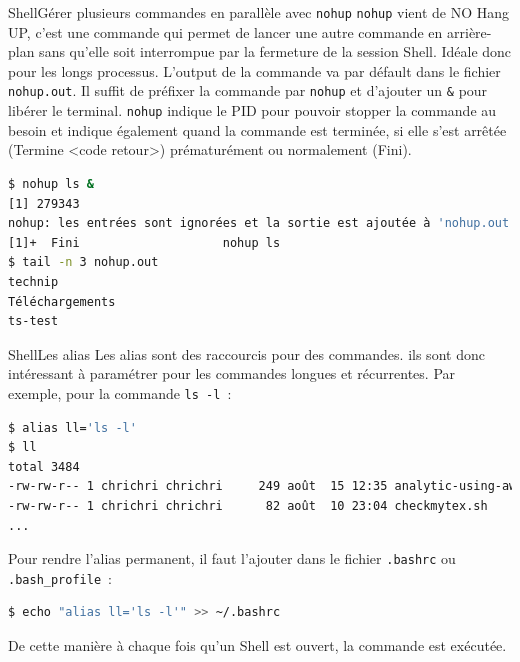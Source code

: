 \documentclass{beamer}
\begin{document}
    \begin{frame}[fragile]{Shell}{Gérer plusieurs commandes en parallèle avec \lstinline{nohup}}
        \lstinline{nohup} vient de NO Hang UP, c'est une commande qui permet de lancer une autre commande en arrière-plan sans qu'elle soit interrompue par la fermeture de la session Shell.
        Idéale donc pour les longs processus.
        L'output de la commande va par défault dans le fichier \lstinline{nohup.out}.
        \bigbreak
        Il suffit de préfixer la commande par \lstinline{nohup} et d'ajouter un \lstinline{&} pour libérer le terminal.
        \lstinline{nohup} indique le PID pour pouvoir stopper la commande au besoin et indique également quand la commande est terminée, si elle s'est arrêtée (Termine <code retour>) prématurément ou normalement (Fini).
        \begin{lstlisting}[language=bash]
$ nohup ls &
[1] 279343
nohup: les entrées sont ignorées et la sortie est ajoutée à 'nohup.out'
[1]+  Fini                    nohup ls
$ tail -n 3 nohup.out
technip
Téléchargements
ts-test
        \end{lstlisting}
    \end{frame}

    \begin{frame}[fragile]{Shell}{Les alias}
        Les alias sont des raccourcis pour des commandes.
        ils sont donc intéressant à paramétrer pour les commandes longues et récurrentes.
        \bigbreak
        Par exemple, pour la commande \lstinline{ls -l}~:
        \begin{lstlisting}[language=bash]
$ alias ll='ls -l'
$ ll
total 3484
-rw-rw-r-- 1 chrichri chrichri     249 août  15 12:35 analytic-using-awk.sh
-rw-rw-r-- 1 chrichri chrichri      82 août  10 23:04 checkmytex.sh
...
        \end{lstlisting}
        \bigbreak
        Pour rendre l'alias permanent, il faut l'ajouter dans le fichier \lstinline{.bashrc} ou \lstinline{.bash_profile}~:
        \begin{lstlisting}[language=bash]
$ echo "alias ll='ls -l'" >> ~/.bashrc
        \end{lstlisting}
        De cette manière à chaque fois qu'un Shell est ouvert, la commande est exécutée.
    \end{frame}
\end{document}
